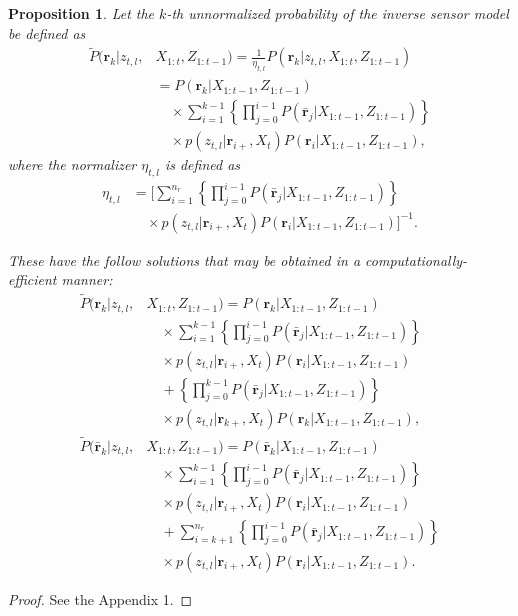 \documentclass[letterpaper, 10pt, conference]{ieeeconf}
\newtheorem{prop}{Proposition}
\begin{document}
\begin{prop}
Let the $k$-th unnormalized probability of the inverse sensor model be defined as
\begin{align}
\label{eqn:Unnormalized}
\tilde P(\mathbf{r}_k|z_{t,l},&X_{1:t},Z_{1:t-1})=\frac1{\eta_{t,l}}P(\mathbf{r}_k|z_{t,l},X_{1:t},Z_{1:t-1})\nonumber\\&=P(\mathbf{r}_k|X_{1:t-1},Z_{1:t-1})\nonumber\\
&\quad\times \sum_{i=1}^{k-1}\left\{\prod_{j=0}^{i-1}P(\bar{\mathbf{r}}_j|X_{1:t-1},Z_{1:t-1})\right\}\nonumber\\
&\quad\times p(z_{t,l}|\mathbf{r}_{i+},X_t)P(\mathbf{r}_i|X_{1:t-1},Z_{1:t-1})
,
\end{align}
where the normalizer $\eta_{t,l}$ is defined as
\begin{align}
\label{eqn:allEta}
\eta_{t,l}
&=
\bigg[\sum_{i=1}^{n_r}\left\{\prod_{j=0}^{i-1}P(\bar{\mathbf{r}}_j|X_{1:t-1},Z_{1:t-1})\right\}\nonumber\\&\quad\times p(z_{t,l}|\mathbf{r}_{i+},X_t)P(\mathbf{r}_i|X_{1:t-1},Z_{1:t-1})\bigg]^{-1}.
\end{align}


These have the follow solutions that may be obtained in a computationally-efficient manner:
\begin{align}
\label{eqn:tildePresult}
\tilde P(\mathbf{r}_k|z_{t,l},&X_{1:t},Z_{1:t-1})=P(\mathbf{r}_k|X_{1:t-1},Z_{1:t-1})\nonumber\\
&\quad\times \sum_{i=1}^{k-1}\left\{\prod_{j=0}^{i-1}P(\bar{\mathbf{r}}_j|X_{1:t-1},Z_{1:t-1})\right\}\nonumber\\
&\quad\times p(z_{t,l}|\mathbf{r}_{i+},X_t)P(\mathbf{r}_i|X_{1:t-1},Z_{1:t-1})
\nonumber
\\
&\quad
+
\left\{\prod_{j=0}^{k-1}P(\bar{\mathbf{r}}_j|X_{1:t-1},Z_{1:t-1})\right\}\nonumber\\
&\quad\times p(z_{t,l}|\mathbf{r}_{k+},X_t)P(\mathbf{r}_k|X_{1:t-1},Z_{1:t-1}),
\\
\label{eqn:tildePcomplementresult}
\tilde P(\bar{\mathbf{r}}_k|z_{t,l},&X_{1:t},Z_{1:t-1})
=P(\bar{\mathbf{r}}_k|X_{1:t-1},Z_{1:t-1})\nonumber\\
&\quad\times \sum_{i=1}^{k-1}\left\{\prod_{j=0}^{i-1}P(\bar{\mathbf{r}}_j|X_{1:t-1},Z_{1:t-1})\right\}\nonumber\\
&\quad\times p(z_{t,l}|\mathbf{r}_{i+},X_t)P(\mathbf{r}_i|X_{1:t-1},Z_{1:t-1})
\nonumber
\\
&\quad
+
\sum_{i=k+1}^{n_r}\left\{\prod_{j=0}^{i-1}P(\bar{\mathbf{r}}_j|X_{1:t-1},Z_{1:t-1})\right\}\nonumber\\
&\quad\times p(z_{t,l}|\mathbf{r}_{i+},X_t)P(\mathbf{r}_i|X_{1:t-1},Z_{1:t-1}).
\end{align}
\end{prop}
\begin{proof}
See the Appendix 1.
\end{proof}
\end{document}
